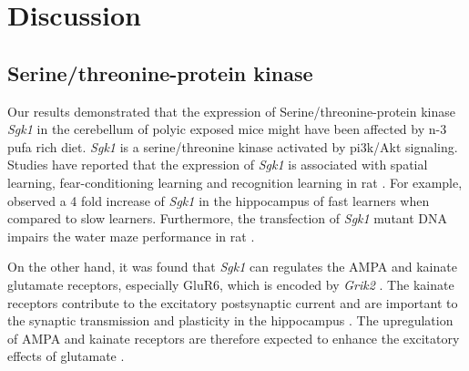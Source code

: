 %	

\section{Discussion}
\subsection{Serine/threonine-protein kinase}
Our results demonstrated that the expression of Serine/threonine-protein kinase \textit{Sgk1} in the cerebellum of \gls{polyic} exposed mice might have been affected by n-3 \gls{pufa} rich diet.
\textit{Sgk1} is a serine/threonine kinase activated by \gls{pi3k}/Akt signaling.
Studies have reported that the expression of \textit{Sgk1} is associated with spatial learning, fear-conditioning learning and recognition learning in rat \citep{Tsai2002,Lee2003}.
For example, \citet{Tsai2002} observed a 4 fold increase of \textit{Sgk1} in the hippocampus of fast learners when compared to slow learners.
Furthermore, the transfection of \textit{Sgk1} mutant DNA impairs the water maze performance in rat \citep{Tsai2002}.

On the other hand, it was found that \textit{Sgk1} can regulates the AMPA and kainate glutamate receptors, especially GluR6, which is encoded by \textit{Grik2} \citep{Lang2006,Lang2010}.
The kainate receptors contribute to the excitatory postsynaptic current and are important to the synaptic transmission and plasticity in the hippocampus \citep{Lang2006}.
The upregulation of AMPA and kainate receptors are therefore expected to enhance the excitatory effects of glutamate \citep{Lang2010}.

